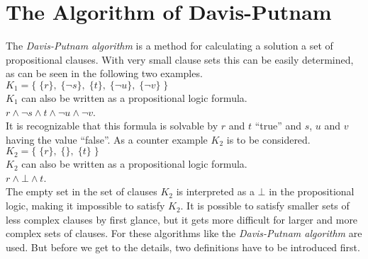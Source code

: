 \section{The Algorithm of Davis-Putnam}
\label{sec:sciDavisPutnam}
The \textit{Davis-Putnam algorithm} is a method for calculating a solution a set of propositional clauses. With very small clause sets this can be easily determined, as can be seen in the following two examples.
\\[0.2cm]
\hspace*{1.3cm} $K_1 = \bigl\{\; \{r\},\; \{\neg s\},\; \{t\},\; \{\neg u\}, \; \{\neg v\} \;\bigr\}$ 
\\[0.2cm]
$K_1$ can also be written as a propositional logic formula.
\\[0.2cm]
\hspace*{1.3cm} $r \land \neg s \land t \land \neg u \land \neg v$.
\\[0.2cm]
It is recognizable that this formula is solvable by $r$ and $t$ \enquote{true} and $s$, $u$ and $v$ having the value \enquote{false}.
As a counter example $K_2$ is to be considered.
\\[0.2cm]
\hspace*{1.3cm} $K_2 = \bigl\{\; \{r\},\; \{\},\; \{t\} \;\bigr\}$
\\[0.2cm]
$K_2$ can also be written as a propositional logic formula.
\\[0.2cm]
\hspace*{1.3cm}
$r \land \bot \land t$.
\\[0.2cm]
The empty set in the set of clauses $K_2$ is interpreted as a $\bot$ in the propositional logic, making it impossible to satisfy $K_2$. It is possible to satisfy smaller sets of less complex clauses by first glance, but it gets more difficult for larger and more complex sets of clauses. For these algorithms like the \textit{Davis-Putnam algorithm} are used. But before we get to the details, two definitions have to be introduced first. \cite{Zhang2000}

